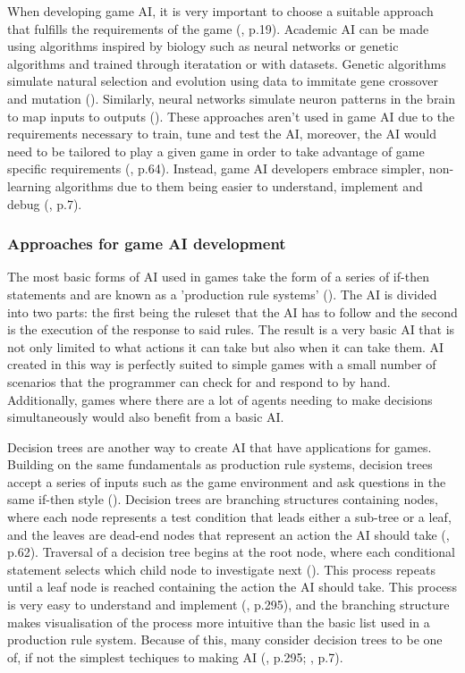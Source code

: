 \documentclass[11pt, a4paper]{article}
\begin{document}
When developing game AI, it is very important to choose a suitable approach that fulfills the requirements of the game (\cite{millington2019ai}, p.19). Academic AI can be made using algorithms inspired by biology such as neural networks or genetic algorithms and trained through iteratation or with datasets. Genetic algorithms simulate natural selection and evolution using data to immitate gene crossover and mutation (\cite{tozour2002evolution}). Similarly, neural networks simulate neuron patterns in the brain to map inputs to outputs (\cite{tozour2002evolution}). These approaches aren't used in game AI due to the requirements necessary to train, tune and test the AI, moreover, the AI would need to be tailored to play a given game in order to take advantage of game specific requirements (\cite{nareyek2004ai}, p.64). Instead, game AI developers embrace simpler, non-learning algorithms due to them being easier to understand, implement and debug (\cite{tozour2002evolution}, p.7).

\subsubsection{Approaches for game AI development}

The most basic forms of AI used in games take the form of a series of if-then statements and are known as a 'production rule systems' (\cite{tozour2002evolution}). The AI is divided into two parts: the first being the ruleset that the AI has to follow and the second is the execution of the response to said rules. The result is a very basic AI that is not only limited to what actions it can take but also when it can take them. AI created in this way is perfectly suited to simple games with a small number of scenarios that the programmer can check for and respond to by hand. Additionally, games where there are a lot of agents needing to make decisions simultaneously would also benefit from a basic AI.

Decision trees are another way to create AI that have applications for games. Building on the same fundamentals as production rule systems, decision trees accept a series of inputs such as the game environment and ask questions in the same if-then style (\cite{tozour2002evolution}). Decision trees are branching structures containing nodes, where each node represents a test condition that leads either a sub-tree or a leaf, and the leaves are dead-end nodes that represent an action the AI should take (\cite{nareyek2004ai}, p.62). Traversal of a decision tree begins at the root node, where each conditional statement selects which child node to investigate next (\cite{nareyek2004ai}). This process repeats until a leaf node is reached containing the action the AI should take. This process is very easy to understand and implement (\cite{millington2019ai}, p.295), and the branching structure makes visualisation of the process more intuitive than the basic list used in a production rule system. Because of this, many consider decision trees to be one of, if not the simplest techiques to making AI (\cite{millington2019ai}, p.295; \cite{tozour2002evolution}, p.7).
\end{document}
